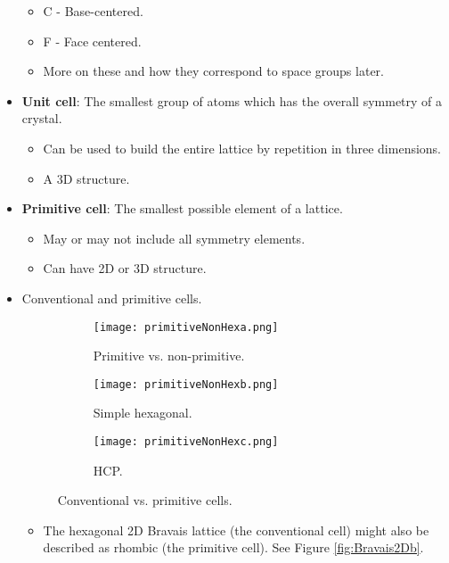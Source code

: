 \documentclass[../notes.tex]{subfiles}
\begin{document}
\begin{itemize}
\begin{itemize}
        \item C - Base-centered.
        \item F - Face centered.
        \item More on these and how they correspond to space groups later.
    \end{itemize}
    \item \textbf{Unit cell}: The smallest group of atoms which has the overall symmetry of a crystal.
    \begin{itemize}
        \item Can be used to build the entire lattice by repetition in three dimensions.
        \item A 3D structure.
    \end{itemize}
    \item \textbf{Primitive cell}: The smallest possible element of a lattice.
    \begin{itemize}
        \item May or may not include all symmetry elements.
        \item Can have 2D or 3D structure.
    \end{itemize}
    \item Conventional and primitive cells.
    \begin{figure}[h!]
        \centering
        \begin{subfigure}[b]{0.33\linewidth}
            \centering
            \texttt{[image: primitiveNonHexa.png]}
            \caption{Primitive vs. non-primitive.}
            \label{fig:primitiveNonHexa}
        \end{subfigure}
        \begin{subfigure}[b]{0.32\linewidth}
            \centering
            \texttt{[image: primitiveNonHexb.png]}
            \caption{Simple hexagonal.}
            \label{fig:primitiveNonHexb}
        \end{subfigure}
        \begin{subfigure}[b]{0.33\linewidth}
            \centering
            \texttt{[image: primitiveNonHexc.png]}
            \caption{HCP.}
            \label{fig:primitiveNonHexc}
        \end{subfigure}
        \caption{Conventional vs. primitive cells.}
        \label{fig:primitiveNonHex}
    \end{figure}
    \begin{itemize}
        \item The hexagonal 2D Bravais lattice (the conventional cell) might also be described as rhombic (the primitive cell). See Figure \ref{fig:Bravais2Db}.

\end{itemize}
\end{itemize}
\end{document}

